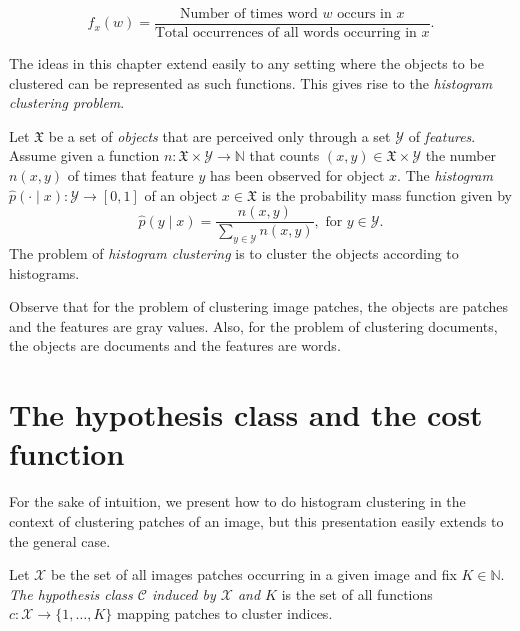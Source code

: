 \begin{equation}
f_x(w) = \frac{\text{Number of times word $w$ occurs in $x$}}{\text{Total occurrences of all words occurring in $x$}}.
\end{equation}

The ideas in this chapter extend easily to any setting where the objects
to be clustered can be represented as such functions. This gives rise to the \emph{histogram clustering problem}.

\begin{definition}
Let $\mathfrak{X}$ be a set of \emph{objects} that are perceived only through a set $\mathcal{Y}$ of \emph{features}. Assume given a function $n : \mathfrak{X} \times \mathcal{Y} \to \mathbb{N}$ that counts $(x, y) \in \mathfrak{X} \times \mathcal{Y}$ the number $n(x,y)$ of times that feature $y$ has been observed for object $x$. The \emph{histogram} $\hat{p}\left(\cdot \mid x\right) : \mathcal{Y} \to [0, 1]$ of an object $x \in \mathfrak{X}$ is the probability mass function given by
%
\begin{equation}
\hat{p}\left(y \mid x\right) = \frac{n(x,y)}{\sum_{y \in \mathcal{Y}}n(x, y)}, \text{ for $y \in \mathcal{Y}$}.
\end{equation}
%
The problem of \emph{histogram clustering} is to cluster the objects according to histograms.
\end{definition}

Observe that for the problem of clustering image patches, the objects are
patches and the features are gray values. Also, for the problem of clustering
documents, the objects are documents and the features are words.

\section{The hypothesis class and the cost function}

For the sake of intuition, we present how to do histogram clustering in
the context of clustering patches of an image, but this presentation easily
extends to the general case.

\begin{definition}
Let $\mathcal{X}$ be the set of all images patches occurring in a given image and fix $K \in \mathbb{N}$. \emph{The hypothesis class $\mathcal{C}$ induced by $\mathcal{X}$ and $K$} is the set of all functions $c : \mathcal{X} \to \{1, \ldots, K\}$ mapping patches to cluster indices.
\end{definition}

